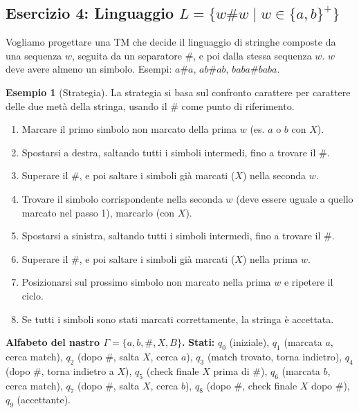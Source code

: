 \documentclass[a4paper]{article}
\theoremstyle{definition} %
\newtheorem{example}{Esempio}
\begin{document}
\subsection{Esercizio 4: Linguaggio $L = \{w\#w \mid w \in \{a,b\}^+\}$}

Vogliamo progettare una TM che decide il linguaggio di stringhe composte da una sequenza $w$, seguita da un separatore $\#$, e poi dalla stessa sequenza $w$. $w$ deve avere almeno un simbolo. Esempi: $a\#a$, $ab\#ab$, $baba\#baba$.

\begin{example}[Strategia]
La strategia si basa sul confronto carattere per carattere delle due metà della stringa, usando il $\#$ come punto di riferimento.
\begin{enumerate}
    \item Marcare il primo simbolo non marcato della prima $w$ (es. $a$ o $b$ con $X$).
    \item Spostarsi a destra, saltando tutti i simboli intermedi, fino a trovare il $\#$.
    \item Superare il $\#$, e poi saltare i simboli già marcati ($X$) nella seconda $w$.
    \item Trovare il simbolo corrispondente nella seconda $w$ (deve essere uguale a quello marcato nel passo 1), marcarlo (con $X$).
    \item Spostarsi a sinistra, saltando tutti i simboli intermedi, fino a trovare il $\#$.
    \item Superare il $\#$, e poi saltare i simboli già marcati ($X$) nella prima $w$.
    \item Posizionarsi sul prossimo simbolo non marcato nella prima $w$ e ripetere il ciclo.
    \item Se tutti i simboli sono stati marcati correttamente, la stringa è accettata.
\end{enumerate}
\end{example}

\noindent \textbf{Alfabeto del nastro $\Gamma = \{a, b, \#, X, B\}$.}
\noindent \textbf{Stati:} $q_0$ (iniziale), $q_1$ (marcata $a$, cerca match), $q_2$ (dopo $\#$, salta $X$, cerca $a$), $q_3$ (match trovato, torna indietro), $q_4$ (dopo $\#$, torna indietro a $X$), $q_5$ (check finale $X$ prima di $\#$), $q_6$ (marcata $b$, cerca match), $q_7$ (dopo $\#$, salta $X$, cerca $b$), $q_8$ (dopo $\#$, check finale $X$ dopo $\#$), $q_9$ (accettante).
\end{document}

